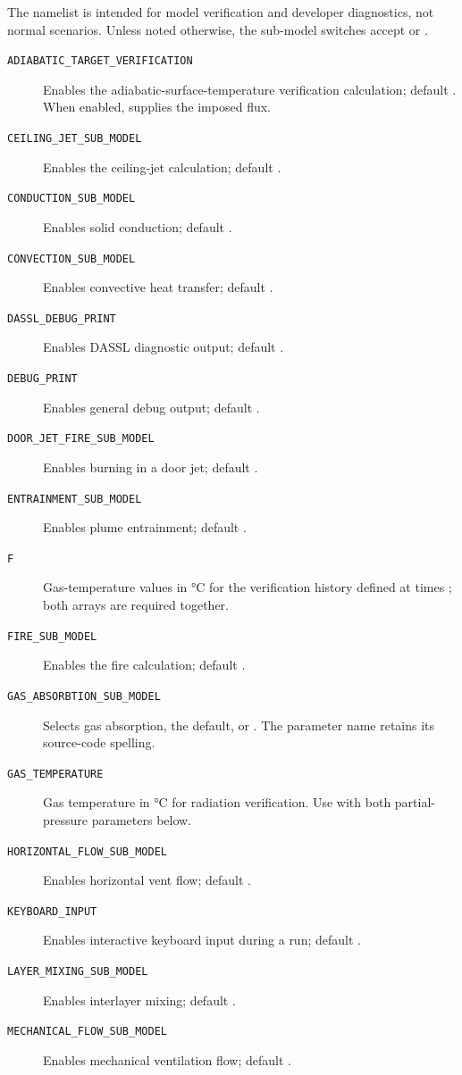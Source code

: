 {{The  namelist is intended for model verification and developer diagnostics, not normal scenarios. Unless noted otherwise, the sub-model switches accept  or .
\begin{description}
\item[\texttt{ADIABATIC\_TARGET\_VERIFICATION}] Enables the adiabatic-surface-temperature verification calculation; default . When enabled,  supplies the imposed flux.
\item[\texttt{CEILING\_JET\_SUB\_MODEL}] Enables the ceiling-jet calculation; default .
\item[\texttt{CONDUCTION\_SUB\_MODEL}] Enables solid conduction; default .
\item[\texttt{CONVECTION\_SUB\_MODEL}] Enables convective heat transfer; default .
\item[\texttt{DASSL\_DEBUG\_PRINT}] Enables DASSL diagnostic output; default .
\item[\texttt{DEBUG\_PRINT}] Enables general debug output; default .
\item[\texttt{DOOR\_JET\_FIRE\_SUB\_MODEL}] Enables burning in a door jet; default .
\item[\texttt{ENTRAINMENT\_SUB\_MODEL}] Enables plume entrainment; default .
\item[\texttt{F}] Gas-temperature values in \unit{\degreeCelsius} for the verification history defined at times ; both arrays are required together.
\item[\texttt{FIRE\_SUB\_MODEL}] Enables the fire calculation; default .
\item[\texttt{GAS\_ABSORBTION\_SUB\_MODEL}] Selects  gas absorption, the default, or . The parameter name retains its source-code spelling.
\item[\texttt{GAS\_TEMPERATURE}] Gas temperature in \unit{\degreeCelsius} for radiation verification. Use with both partial-pressure parameters below.
\item[\texttt{HORIZONTAL\_FLOW\_SUB\_MODEL}] Enables horizontal vent flow; default .
\item[\texttt{KEYBOARD\_INPUT}] Enables interactive keyboard input during a run; default .
\item[\texttt{LAYER\_MIXING\_SUB\_MODEL}] Enables interlayer mixing; default .
\item[\texttt{MECHANICAL\_FLOW\_SUB\_MODEL}] Enables mechanical ventilation flow; default .

\end{description}}}
